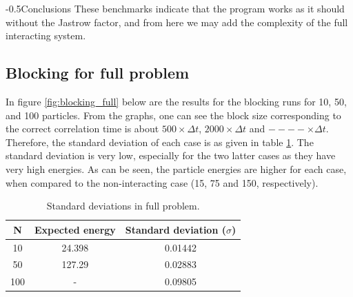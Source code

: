\documentclass[english, a4paper]{article}
\makeatletter
\renewcommand{\subsubsection}{\@startsection{subsubsection}{3}{0pt}%
{-\baselineskip}{0.5\baselineskip}{\bf\large}}
\makeatother
\begin{document}
\subsubsection{Conclusions}
These benchmarks indicate that the program works as it should without the Jastrow factor, and from here we may add the complexity of the full interacting system.

\subsection{Blocking for full problem}
In figure \ref{fig:blocking_full} below are the results for the blocking runs for 10, 50, and 100 particles. From the graphs, one can see the block size corresponding to the correct correlation time is about $500\times\Delta t$, $2000\times\Delta t$ and $----\times\Delta t$. Therefore, the standard deviation of each case is as given in table \ref{tab:Tabell4}. The standard deviation is very low, especially for the two latter cases as they have very high energies.
As can be seen, the particle energies are higher for each case, when compared to the non-interacting case (15, 75 and 150, respectively).

\begin{table}[H]
	\centering
	\caption{Standard deviations in full problem.}
	\begin{tabular}{ | c | c | c |}
		\hline
		N & Expected energy & Standard deviation ($\sigma$)\\*
		\hline
		10 & 24.398 & 0.01442\\
		50 & 127.29 & 0.02883\\
		100 & - & 0.09805\\
		\hline
	\end{tabular}
	\label{tab:Tabell4}
\end{table}
\end{document}

